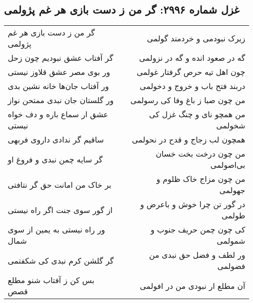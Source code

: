 \begin{center}
\section*{غزل شماره ۲۹۹۶: گر من ز دست بازی هر غم پژولمی}
\label{sec:2996}
\begin{longtable}{l p{0.5cm} r}
گر من ز دست بازی هر غم پژولمی
&&
زیرک نبودمی و خردمند گولمی
\\
گر آفتاب عشق نبودیم چون زحل
&&
گه در صعود انده و گه در نزولمی
\\
ور بوی مصر عشق قلاوز نیستی
&&
چون اهل تیه حرص گرفتار غولمی
\\
ور آفتاب جان‌ها خانه نشین بدی
&&
دربند فتح باب و خروج و دخولمی
\\
ور گلستان جان نبدی ممتحن نواز
&&
من چون صبا ز باغ وفا کی رسولمی
\\
عشق ار سماع باره و دف خواه نیستی
&&
من همچو نای و چنگ غزل کی شخولمی
\\
ساقیم گر ندادی داروی فربهی
&&
همچون لب زجاج و قدح در نحولمی
\\
گر سایه چمن نبدی و فروغ او
&&
من چون درخت بخت خسان بی‌اصولمی
\\
بر خاک من امانت حق گر نتافتی
&&
من چون مزاج خاک ظلوم و جهولمی
\\
از گور سوی جنت اگر راه نیستی
&&
در گور تن چرا خوش و باعرض و طولمی
\\
ور راه نیستی به یمین از سوی شمال
&&
کی چون چمن حریف جنوب و شمولمی
\\
گر گلشن کرم نبدی کی شکفتمی
&&
ور لطف و فضل حق نبدی من فضولمی
\\
بس کن ز آفتاب شنو مطلع قصص
&&
آن مطلع ار نبودی من در افولمی
\\
\end{longtable}
\end{center}
